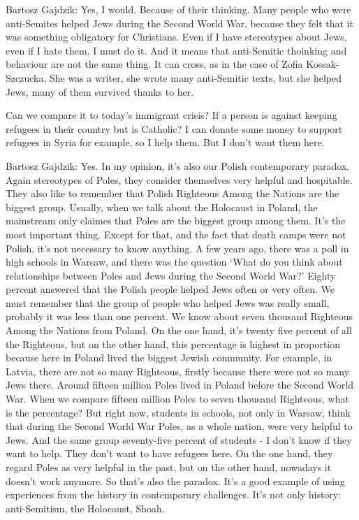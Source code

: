 Bartosz Gajdzik: Yes, I would. Because of their thinking. Many people who were anti-Semites helped Jews during the Second World War, because they felt that it was something obligatory for Christians. Even if I have stereotypes about Jews, even if I hate them, I must do it. And it means that anti-Semitic thoinking and behaviour are not the same thing. It can cross, as in the case of Zofia Kossak-Szczucka. She was a writer, she wrote many anti-Semitic texts, but she helped Jews, many of them survived thanks to her.  

Can we compare it to today’s immigrant crisis? If a person is against keeping refugees in their country but is Catholic?  I can donate some money to support refugees in Syria for example, so I help them. But I don’t want them here.  

Bartosz Gajdzik: Yes. In my opinion, it’s also our Polish contemporary paradox. Again stereotypes of Poles, they consider themselves very helpful and hospitable. They also like to remember that Polish Righteous Among the Nations are the biggest group. Usually, when we talk about the Holocaust in Poland, the mainstream only claimes that Poles are the biggest group among them. It’s the most important thing. Except for that, and the fact that death camps were not Polish, it’s not necessary to know anything. A few years ago, there was a poll in high schools in Warsaw, and there was the question ‘What do you think about relationships between Poles and Jews during the Second World War?’ Eighty percent answered that the Polish people helped Jews often or very often. We must remember that the group of people who helped Jews was really small, probably it was less than one percent. We know about seven thousand Righteous Among the Nations from Poland. On the one hand, it’s twenty five percent of all the Righteous, but on the other hand, this percentage is highest in proportion because here in Poland lived the biggest Jewish community. For example, in Latvia, there are not so many Righteous, firstly because there were not so many Jews there. Around fifteen million Poles lived in Poland before the Second World War. When we compare fifteen million Poles to seven thousand Righteous, what is the percentage? But right now, students in schools, not only in Warsaw, think that during the Second World War Poles, as a whole nation, were very helpful to Jews. And the same group seventy-five percent of students - I don’t know if they want to help. They don’t want to have refugees here. On the one hand, they regard Poles as very helpful in the past, but on the other hand, nowadays it doesn’t work anymore. So that’s also the paradox. It’s a good example of using experiences from the history in contemporary challenges. It’s not only history: anti-Semitism, the Holocaust, Shoah.  

